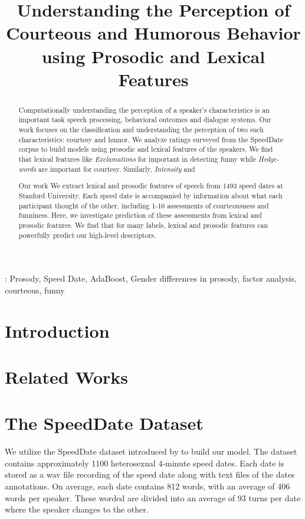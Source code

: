 \documentclass[a4paper]{article}
\title{Understanding the Perception of Courteous and Humorous Behavior using Prosodic and Lexical Features}
\begin{document}
\maketitle
%

\begin{abstract}
Computationally understanding the perception of a speaker's characteristics is an important task speech processing, behavioral outcomes and dialogue systems. Our work focuses on the classification and understanding the perception of two such characteristics: courtesy and humor. We analyze ratings surveyed from the SpeedDate corpus to build models using prosodic and lexical features of the speakers. We find that lexical features like \textit{Exclamations} for important in detecting funny while \textit{Hedge-words} are important for courtesy. Similarly, \textit{Intensity} and 

Our work We extract lexical and prosodic features of speech from 1493 speed dates at Stanford University.  Each speed date is accompanied by information about what each participant thought of the other, including 1-10 assessments of courteousness and funniness.  Here, we investigate prediction of these assessments from lexical and prosodic features.  We find that for many labels, lexical and prosodic features can powerfully predict our high-level descriptors.
\end{abstract}

: Prosody, Speed Date, AdaBoost, Gender differences in prosody, factor analysis, courteous, funny

%

\section{Introduction}

\section{Related Works}


\section{The SpeedDate Dataset}
We utilize the SpeedDate dataset introduced by \cite{jurafsky} to build our model. The dataset contains approximately 1100 heterosexual 4-minute speed dates. Each date is stored as a wav file recording of the speed date along with text files of the dates annotations. On average, each date contains 
812 words, with an average of 406 words per speaker. These worded are divided into an average of 93 turns per date where the speaker changes to the other.
\end{document}
